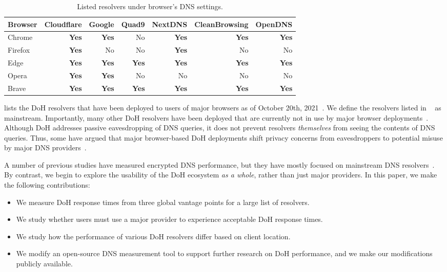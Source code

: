\begin{table}
    \centering
    \begin{tabular}{lrrrrrr}
    \hline
    Browser & Cloudflare & Google & Quad9 & NextDNS & CleanBrowsing & OpenDNS
    \\
    \midrule
    Chrome    & \textbf{Yes} & \textbf{Yes} & No & \textbf{Yes} & \textbf{Yes} & \textbf{Yes} \\
    Firefox  & \textbf{Yes} & No & No & \textbf{Yes} & No & No \\ 
    Edge   & \textbf{Yes} & \textbf{Yes} & \textbf{Yes} & \textbf{Yes} & \textbf{Yes} & \textbf{Yes} \\
    Opera            & \textbf{Yes} & \textbf{Yes} & No & No & No & No \\
    Brave            & \textbf{Yes} & \textbf{Yes} & \textbf{Yes} & \textbf{Yes} & \textbf{Yes} & \textbf{Yes} \\
    \bottomrule
    \end{tabular}
    \caption{Listed resolvers under browser's DNS settings.}
    \label{tab:SupportedResolvers}
\end{table}

 lists the DoH resolvers that have been deployed to users of major browsers as of October 20th, 2021~\cite{bravebrowser,edgebrowser,ffbrowser,chromebrowser,operabrowser}.
We define the resolvers listed in ~ as mainstream. 
Importantly, many other DoH resolvers have been deployed that are currently not in use by major browser deployments~\cite{dnscrypt}.
Although DoH addresses passive eavesdropping of DNS queries, it does not prevent resolvers \emph{themselves} from seeing the contents of DNS queries.
Thus, some have argued that major browser-based DoH deployments shift privacy concerns from eavesdroppers to potential misuse by major DNS providers~\cite{vixie}.

A number of previous studies have measured encrypted DNS performance, but they have mostly focused on mainstream DNS resolvers~\cite{borgolte2019dns,hounsel2020comparing,KResolver}.
By contrast, we begin to explore the usability of the DoH ecosystem \emph{as a whole}, rather than just major providers.
In this paper, we make the following contributions:
\begin{itemize}
    \item We measure DoH response times from three global vantage points for a large list of resolvers.
    \item We study whether users must use a major provider to experience acceptable DoH response times.
    \item We study how the performance of various DoH resolvers differ based on client location.
    \item We modify an open-source DNS measurement tool to support further research on DoH performance, and we make our modifications publicly available.
\end{itemize}

